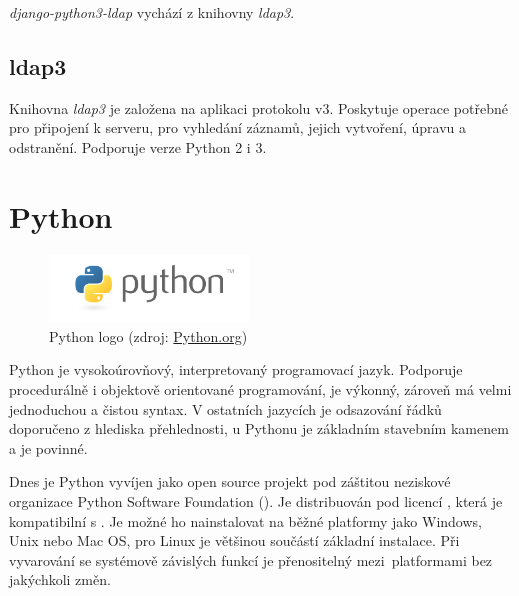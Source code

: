 \textit{django-python3-ldap} vychází z knihovny \textit{ldap3}.

\subsection{ldap3}
Knihovna \textit{ldap3} je založena na aplikaci protokolu 
v3. Poskytuje operace potřebné pro připojení k  serveru, pro
vyhledání záznamů, jejich vytvoření, úpravu a odstranění. Podporuje
verze Python 2 i 3.


\section{Python}

\begin{figure}[H] \centering
      \includegraphics[width=150pt]{./pictures/python-logo-master-v3-TM.png}
      \caption[Python logo]{Python logo (zdroj:
\href{https://www.python.org/static/community_logos/python-logo-master-v3-TM.png}{Python.org})}
      \label{fig:python}
  \end{figure}
  

Python je vysokoúrovňový, interpretovaný programovací jazyk. Podporuje
procedurálně i objektově orientované programování, je výkonný, zároveň
má velmi jednoduchou a čistou syntax. V ostatních jazycích je
odsazování řádků doporučeno z hlediska přehlednosti, u Pythonu je
základním stavebním kamenem a je povinné.\cite{Kulovana, 2017}

Dnes je Python vyvíjen jako open source projekt
pod záštitou neziskové organizace Python Software Foundation
(). Je distribuován pod licencí , která je
kompatibilní s . Je možné ho nainstalovat na běžné platformy
jako Windows, Unix nebo Mac OS, pro Linux je většinou součástí
základní instalace. Při vyvarování se systémově závislých funkcí je
přenositelný mezi~platformami bez jakýchkoli změn.

